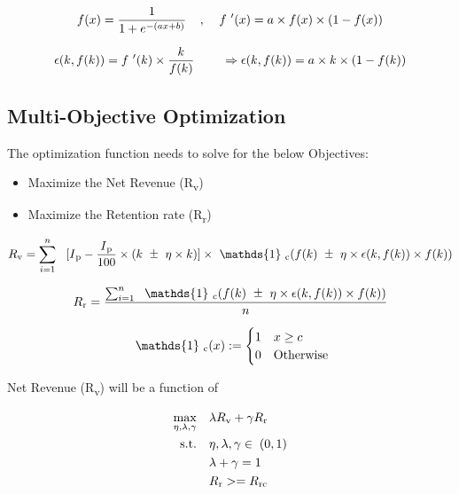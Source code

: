  \begin{equation}
    f(x) = \frac{1}{1 + e^{-(ax+b)}} \;\;\;\; ,\;\;\;\;
    f\textsuperscript{'}(x) = a\times f(x)\times (1 - f(x))
    \label{eq:fx}
  \end{equation}


 \begin{equation}
    \epsilon(k,f(k)) = f\textsuperscript{'}(k) \times\frac{k}{f(k)} \;\;\;\; \;\;\;\;
    \Rightarrow \epsilon(k,f(k)) = a\times k\times (1 - f(k))
    \label{eq:fx}
  \end{equation}

\subsection{Multi-Objective Optimization}
The optimization function needs to solve for the below Objectives:
\begin{itemize}
\item Maximize the Net Revenue (R\textsubscript{v})
\item Maximize the Retention rate (R\textsubscript{r})
\end{itemize}

 \begin{equation}
    R\textsubscript{v} = \sum_{i=1}^{n}\;\;\;[I\textsubscript{p} - \frac{I\textsubscript{p}}{100} \times (k \mypm \eta\times k)]
    \times
    \ \mathds{1} \ \textsubscript{c}(f(k) \mypm \eta\times \epsilon(k,f(k))\times f(k))
    \label{eq:fx}
  \end{equation}

\begin{equation}
    R\textsubscript{r} = \frac{\sum_{i=1}^{n}\; \ \mathds{1} \ \textsubscript{c}(f(k) \mypm \eta\times 
    \epsilon(k,f(k))\times f(k))}{n}
    \label{eq:fx}
  \end{equation}

  \begin{equation}
    \ \mathds{1} \ \textsubscript{c}(x) :=
        \begin{cases}
          1 & x \geq c\\
          0 & \text{Otherwise}
        \end{cases}
    \label{eq:fx}
  \end{equation}

Net Revenue (R\textsubscript{v}) will be a function of 

\begin{equation}
\begin{aligned}
\max_{\eta, \lambda, \gamma} \quad & 
\lambda R\textsubscript{v} + \gamma R\textsubscript{r}\\
\textrm{s.t.} \quad & 
\eta, \lambda, \gamma \in \; (0,1) \\
&\lambda + \gamma = 1\\
&R\textsubscript{r} >= R\textsubscript{rc} \\
\end{aligned}
\end{equation}

